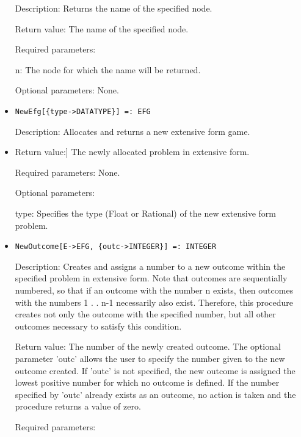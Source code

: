 \begin{itemize}
\bd
\item
[Description:] Returns the name of the specified node.
\item
[Return value:] The name of the specified node.
\item
[Required parameters:]\hfil\null

\bd
\item
[ n:] The node for which the name will be returned.
\ed

\item
[Optional parameters:] None.
\ed

\item
\protect \large \begin{verbatim}
NewEfg[{type->DATATYPE}] =: EFG
\end{verbatim}\normalsize

\bd
\item
[Description:] Allocates and returns a new extensive form game.
\item
 Return value:] The newly allocated problem in extensive form.
\item
[Required parameters:] None.
\item
[Optional parameters:]\hfil\null

\bd
\item
[ type:] Specifies the type (Float or Rational) of the new extensive
form problem.
\ed
\ed

\item
\protect \large \begin{verbatim}
NewOutcome[E->EFG, {outc->INTEGER}] =: INTEGER
\end{verbatim}\normalsize

\bd
\item
[Description:] Creates and assigns a number to a new outcome within the
specified problem in extensive form.  Note that outcomes are 
sequentially numbered, so that if an outcome with the number n exists,
then outcomes with the numbers 1 . . n-1 necessarily also exist.
Therefore, this procedure creates not only the outcome with the 
specified number, but all other outcomes necessary to satisfy this 
condition.
\item
[Return value:] The number of the newly created outcome.  The optional 
parameter 'outc' allows the user to specify the number given to the new
outcome created.  If 'outc' is not specified, the new outcome is 
assigned the lowest positive number for which no outcome is defined.  
If the number specified by 'outc' already exists as an outcome, no 
action is taken and the procedure returns a value of zero.
\item
[Required parameters:]\hfil\null


\end{itemize}
